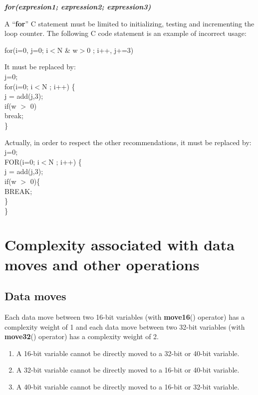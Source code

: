 \textbf{\emph{for(expresion1; expression2; expression3)}}

A ``\textbf{for}'' C statement must be limited to initializing,
testing and incrementing the loop counter. The following C code
statement is an example of incorrect usage:

for(i=0, j=0; i$<$N \& w$>$0 ; i++, j+=3)

It must be replaced by: \\
j=0;\\
for(i=0; i$<$N ; i++) \{\\
j = add(j,3);\\
if(w $>$ 0)\\
break; \\
\}

Actually, in order to respect the other recommendations, it must
be replaced by: \\
j=0;\\
FOR(i=0; i$<$N ; i++) \{\\
j = add(j,3);\\
if(w $>$ 0)\{\\
BREAK; \\
\}\\
\}


\section{Complexity associated with data moves and other operations}

\subsection{Data moves}

Each data move between two 16-bit variables (with
\textbf{move16}() operator) has a complexity weight of 1 and each
data move between two 32-bit variables (with \textbf{move32}()
operator) has a complexity weight of 2.
\begin{enumerate}{}{}
\item A 16-bit variable cannot be directly moved to a 32-bit or 40-bit variable.
\item A 32-bit variable cannot be directly moved to a 16-bit or 40-bit variable.
\item A 40-bit variable cannot be directly moved to a 16-bit or 32-bit variable.
\end{enumerate}

